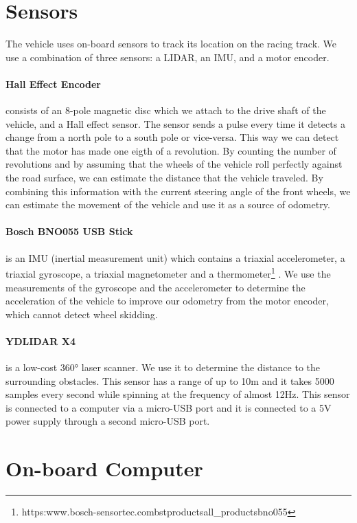 \section{Sensors}

The vehicle uses on-board sensors to track its location on the racing track. We use a combination of three sensors: a LIDAR, an IMU, and a motor encoder.

\paragraph{Hall Effect Encoder} consists of an 8-pole magnetic disc which we attach to the drive shaft of the vehicle, and a Hall effect sensor. The sensor sends a pulse every time it detects a change from a north pole to a south pole or vice-versa. This way we can detect that the motor has made one eigth of a revolution. By counting the number of revolutions and by assuming that the wheels of the vehicle roll perfectly against the road surface, we can estimate the distance that the vehicle traveled. By combining this information with the current steering angle of the front wheels, we can estimate the movement of the vehicle and use it as a source of odometry.

\paragraph{Bosch BNO055 USB Stick} is an IMU (inertial measurement unit) which contains a triaxial accelerometer, a triaxial gyroscope, a triaxial magnetometer and a thermometer\footnote{https:\/\/www.bosch-sensortec.com\/bst\/products\/all_products\/bno055} . We use the measurements of the gyroscope and the accelerometer to determine the acceleration of the vehicle to improve our odometry from the motor encoder, which cannot detect wheel skidding.

\paragraph{YDLIDAR X4} is a low-cost \ang{360} laser scanner. We use it to determine the distance to the surrounding obstacles. This sensor has a range of up to \si{10}{m} and it takes \num{5000} samples every second while spinning at the frequency of almost \si{12}{Hz}. This sensor is connected to a computer via a micro-USB port and it is connected to a \si{5}{V} power supply through a second micro-USB port.

\section{On-board Computer}


